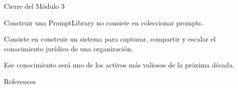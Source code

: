 \documentclass[aspectratio=169]{beamer}
\begin{document}
\begin{frame}{Cierre del Módulo 3}


Construir una  PromptLibrary no consiste en coleccionar prompts.

Consiste en construir un sistema para capturar, compartir y escalar el conocimiento jurídico de una organización.

Ese conocimiento será uno de los activos más valiosos de la próxima década.
\end{frame}



\begin{frame}[allowframebreaks]{References}
  
  
\end{frame}
\end{document}
